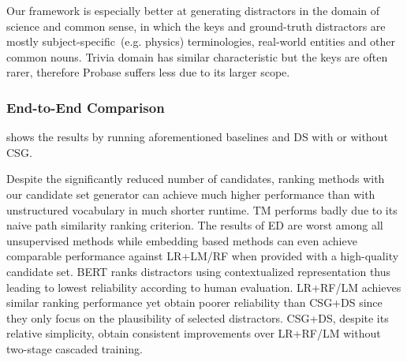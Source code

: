 Our framework is especially better at generating distractors in the domain of science and common sense, in which the keys and ground-truth distractors are mostly subject-specific~(e.g. physics) terminologies, real-world entities and other common nouns. Trivia domain has similar characteristic but the keys are often rarer, therefore Probase suffers less due to its larger scope.
\subsubsection*{End-to-End Comparison} 
\label{sec:endtoend}
 shows the results by running aforementioned baselines and DS with or without CSG.

Despite the significantly reduced number of candidates, ranking methods with our candidate set generator can achieve much higher performance than with unstructured vocabulary in much shorter runtime. TM performs badly due to its naive path similarity ranking criterion. The results of ED are worst among all unsupervised methods while embedding based methods can even achieve comparable performance against LR+LM/RF when provided with a high-quality candidate set.
BERT ranks distractors using contextualized representation thus leading to lowest reliability according to human evaluation. 
LR+RF/LM achieves similar ranking performance yet obtain poorer reliability than CSG+DS since they only focus on the plausibility of selected distractors. CSG+DS, despite its relative simplicity, obtain consistent improvements over LR+RF/LM without two-stage cascaded training.

